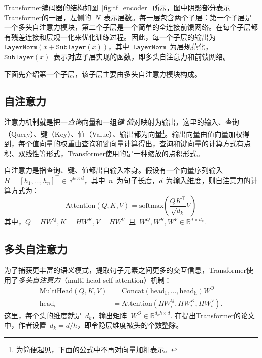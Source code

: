 Transformer编码器的结构如图~\ref{fig:tf_encoder}~所示，图中阴影部分表示Transformer的一层，左侧的~$N$~表示层数。每一层包含两个子层：第一个子层是一个多头自注意力模块，第二个子层是一个简单的全连接前馈网络。在每个子层都有残差连接\cite{DBLP:conf/cvpr/HeZRS16}和层规一化\cite{lei2016layer}来优化训练过程。因此，每一个子层的输出为~$\mathrm{\texttt{LayerNorm}}(x+\mathrm{\texttt{Sublayer}}(x))$，其中~$\mathrm{\texttt{LayerNorm}}$~为层规范化，$\mathrm{\texttt{Sublayer}}(x)$~表示对应子层实现的函数，即多头自注意力和前馈网络。

下面先介绍第一个子层，该子层主要由多头自注意力模块构成。

\subsection{自注意力}
注意力机制就是把一\emph{查询}向量和一组\emph{键}-\emph{值}对映射为输出，这里的输入、查询（Query）、键（Key）、值（Value）、输出都为向量\footnote{为简便起见，下面的公式中不再对向量加粗表示。}。输出向量由值向量加权得到，每个值向量的权重由查询和键向量计算得出，查询和键向量的计算方式有点积、双线性等形式，Transformer使用的是一种缩放的点积形式。

自注意力是指查询、键、值都出自输入本身。假设有一个向量序列输入~$H = [h_1, \hdots, h_n]^\top \in \mathbb{R}^{n\times d}$，其中~$n$~为句子长度，$d$~为输入维度，则自注意力的计算方式为：
\begin{equation}
	\mathrm{Attention}(Q,K,V) = \mathrm{softmax}(\frac{QK^\top}{\sqrt{d_k}}V)
\end{equation}
其中，$Q=HW^Q, K=HW^K, V=HW^V$\ 且\ $W^Q, W^K, W^V\in \mathbb{R}^{d\times d_k}$. 

\subsection{多头自注意力}
为了捕获更丰富的语义模式，提取句子元素之间更多的交互信息，Transformer使用了\emph{多头自注意力}（multi-head self-attention）机制：
\begin{equation}
	\begin{aligned}
	\mathrm{MultiHead}(Q,K,V)& = \mathrm{Concat}(\mathrm{head_1}, \hdots, \mathrm{head_h})W^O
	\\
	\mathrm{head_i} &= \mathrm{Attention}(HW_i^Q, HW_i^K, HW_i^V).
	\end{aligned}
\end{equation}
这里，每个头的维度就是~$d_k$，输出矩阵~$W^O\in \mathbb{R}^{d_kh \times d}$. 在提出Transformer的论文中，作者设置~$d_k=d/h$，即令隐层维度被头的个数整除。

